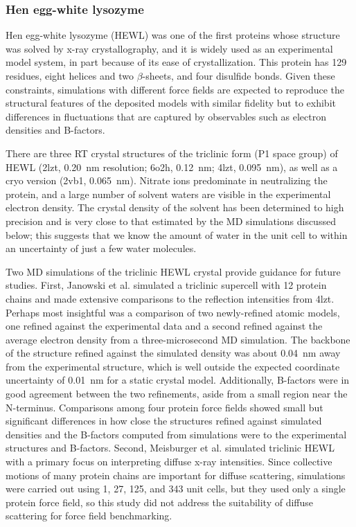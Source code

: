 \documentclass[9pt,review]{livecoms}
\begin{document}
\subsubsection{Hen egg-white lysozyme}
\label{sub2:hewl}

Hen egg-white lysozyme (HEWL) was one of the first proteins whose structure was solved by x-ray crystallography, and it is widely used as an experimental model system, in part because of its ease of crystallization.
This protein has 129 residues, eight helices and two $\beta$-sheets, and four disulfide bonds.
Given these constraints, simulations with different force fields are expected to reproduce the structural features of the deposited models with similar fidelity but to exhibit differences in fluctuations that are captured by observables such as electron densities and B-factors.

There are three RT crystal structures of the triclinic form (P1 space group) of HEWL (2lzt,  \qty{0.20}{\nano\meter} resolution; 6o2h, \qty{0.12}{\nano\meter}; 4lzt, \qty{0.095}{\nano\meter}), as well as a cryo version (2vb1, \qty{0.065}{\nano\meter}).
Nitrate ions predominate in neutralizing the protein, and a large number of solvent waters are visible in the experimental electron density.
The crystal density of the solvent has been determined to high precision \cite{moreau_ice_2020} and is very close to that estimated by the MD simulations discussed below; this suggests that we know the amount of water in the unit cell to within an uncertainty of just a few water molecules. 

Two MD simulations of the triclinic HEWL crystal provide guidance for future studies.
First, Janowski et al. \cite{janowski_molecular_2016} simulated a triclinic supercell with 12 protein chains and made extensive comparisons to the reflection intensities from 4lzt.
Perhaps most insightful was a comparison of two newly-refined atomic models, one refined against the experimental data and a second refined against the average electron density from a three-microsecond MD simulation.
The backbone of the structure refined against the simulated density was about \qty{0.04}{\nano\meter} away from the experimental structure, which is well outside the expected coordinate uncertainty of \qty{0.01}{\nano\meter} for a static crystal model.
Additionally, B-factors were in good agreement between the two refinements, aside from a small region near the N-terminus.
Comparisons among four protein force fields showed small but significant differences in how close the structures refined against simulated densities and the B-factors computed from simulations were to the experimental structures and B-factors.
Second, Meisburger et al. \cite{meisburger_diffuse_2020} simulated triclinic HEWL with a primary focus on interpreting diffuse x-ray intensities.
Since collective motions of many protein chains are important for diffuse scattering, simulations were carried out using 1, 27, 125, and 343 unit cells, but they used only a single protein force field, so this study did not address the suitability of diffuse scattering for force field benchmarking.
\end{document}
